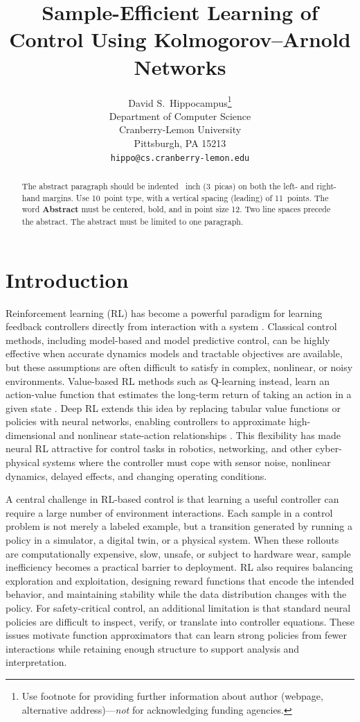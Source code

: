 \documentclass{article}
\title{Sample-Efficient Learning of Control Using Kolmogorov–Arnold Networks}
\author{%
  David S.~Hippocampus\thanks{Use footnote for providing further information
    about author (webpage, alternative address)---\emph{not} for acknowledging
    funding agencies.} \\
  Department of Computer Science\\
  Cranberry-Lemon University\\
  Pittsburgh, PA 15213 \\
  \texttt{hippo@cs.cranberry-lemon.edu} \\
}
\begin{document}
\maketitle


\begin{abstract}
  The abstract paragraph should be indented ~inch (3~picas) on
  both the left- and right-hand margins. Use 10~point type, with a vertical
  spacing (leading) of 11~points.  The word \textbf{Abstract} must be centered,
  bold, and in point size 12. Two line spaces precede the abstract. The abstract
  must be limited to one paragraph.
\end{abstract}

\section{Introduction}

Reinforcement learning (RL) has become a powerful paradigm for learning feedback controllers directly from interaction with a system \cite{sutton2018reinforcement}.
Classical control methods, including model-based and model predictive control, can be highly effective when accurate dynamics models and tractable objectives are available, but these assumptions are often difficult to satisfy in complex, nonlinear, or noisy environments.
Value-based RL methods such as Q-learning instead, learn an action-value function that estimates the long-term return of taking an action in a given state \cite{watkins1992qlearning}.
Deep RL extends this idea by replacing tabular value functions or policies with neural networks, enabling controllers to approximate high-dimensional and nonlinear state-action relationships \cite{mnih2015humanlevel,schulman2017ppo}.
This flexibility has made neural RL attractive for control tasks in robotics, networking, and other cyber-physical systems where the controller must cope with sensor noise, nonlinear dynamics, delayed effects, and changing operating conditions.

A central challenge in RL-based control is that learning a useful controller can require a large number of environment interactions.
Each sample in a control problem is not merely a labeled example, but a transition generated by running a policy in a simulator, a digital twin, or a physical system.
When these rollouts are computationally expensive, slow, unsafe, or subject to hardware wear, sample inefficiency becomes a practical barrier to deployment.
RL also requires balancing exploration and exploitation, designing reward functions that encode the intended behavior, and maintaining stability while the data distribution changes with the policy.
For safety-critical control, an additional limitation is that standard neural policies are difficult to inspect, verify, or translate into controller equations.
These issues motivate function approximators that can learn strong policies from fewer interactions while retaining enough structure to support analysis and interpretation.
\end{document}
